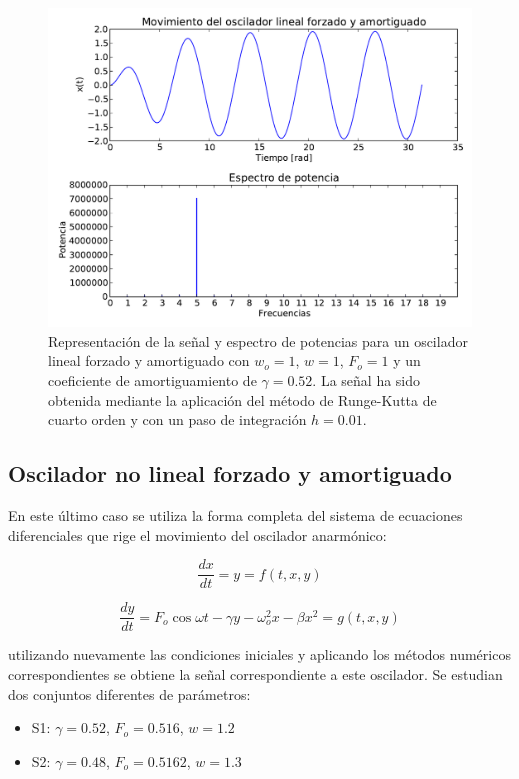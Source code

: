 \documentclass[11pt]{article}
\begin{document}
\begin{figure}[h]
\centering
\includegraphics[width=0.75\linewidth]{caso_forzado_amortiguado.pdf}
\caption{Representación de la señal y espectro de potencias para un oscilador lineal forzado y amortiguado con $w_o = 1$, $w = 1$, $F_o = 1$ y un coeficiente de amortiguamiento de $\gamma = 0.52$. La señal ha sido obtenida mediante la aplicación del método de Runge-Kutta de cuarto orden y con un paso de integración $h = 0.01$.}
\label{fig:caso_forzado_amortiguado}
\end{figure}

\subsection{Oscilador no lineal forzado y amortiguado}
En este último caso se utiliza la forma completa del sistema de ecuaciones diferenciales que rige el movimiento del oscilador anarmónico:

\begin{equation}
	\frac{dx}{dt} = y = f(t, x, y)
\end{equation}

\begin{equation}
	\frac{dy}{dt} = F_{o}\cos{\omega{}t} -\gamma{}y - \omega_{o}^2x - \beta{}x^2 = g(t, x, y) 	
\end{equation}

utilizando nuevamente las condiciones iniciales y aplicando los métodos numéricos correspondientes se obtiene la señal correspondiente a este oscilador. Se estudian dos conjuntos diferentes de parámetros:

\begin{itemize}
	\item S1: $\gamma = 0.52$, $F_o = 0.516$, $w = 1.2$
	\item S2: $\gamma = 0.48$, $F_o = 0.5162$, $w = 1.3$
\end{itemize}
\end{document}
